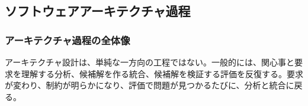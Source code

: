 \subsection{ソフトウェアアーキテクチャ過程}

\subsubsection*{アーキテクチャ過程の全体像}
アーキテクチャ設計は、単純な一方向の工程ではない。一般的には、関心事と要求を理解する分析、候補解を作る統合、候補解を検証する評価を反復する。要求が変わり、制約が明らかになり、評価で問題が見つかるたびに、分析と統合に戻る。
